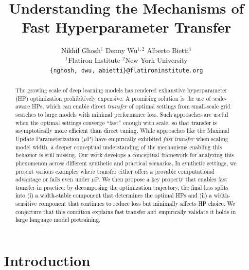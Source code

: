 \documentclass{article} %
\title{\vspace{-3mm}Understanding the Mechanisms of Fast Hyperparameter Transfer}
\author{
Nikhil Ghosh$^{1}$ \quad
Denny Wu$^{1,2}$ \quad
Alberto Bietti$^{1}$ \\
$^{1}$Flatiron Institute \quad
$^{2}$New York University \\
\texttt{\{nghosh, dwu, abietti\}@flatironinstitute.org}
\vspace{-3mm}
}
\newcommand{\rev}[1]{\textcolor{black}{#1}}
\begin{document}
\maketitle 

\vspace{-2mm}

\begin{abstract}

\vspace{-1.25mm}

The growing scale of deep learning models has rendered exhaustive hyperparameter (HP) optimization prohibitively expensive. A promising solution is the use of scale-aware HPs, which can enable direct \emph{transfer} of optimal settings from small-scale grid searches to large models with minimal performance loss. Such approaches are useful when the optimal settings converge ``fast'' enough with scale, \rev{so that transfer is asymptotically more efficient than direct tuning}. While approaches like the Maximal Update Parameterization ($\mu$P) have empirically exhibited \emph{fast transfer} when scaling model width, a deeper conceptual understanding of the mechanisms enabling this behavior is still missing. Our work develops a conceptual framework for analyzing this phenomenon across different synthetic and practical scenarios. In synthetic settings, we present various examples where transfer either offers a provable computational advantage or fails even under $\mu$P. 
We then propose a key property that enables fast transfer in practice: \rev{by decomposing the optimization trajectory, the final loss splits into (i) a width-stable component that determines the optimal HPs and (ii) a width-sensitive component that continues to reduce loss but minimally affects HP choice. We conjecture that this condition explains fast transfer and empirically validate it holds in large language model pretraining.} 
\end{abstract}

\vspace{-2.5mm}

\section{Introduction}
\vspace{-1.5mm}
\end{document}

